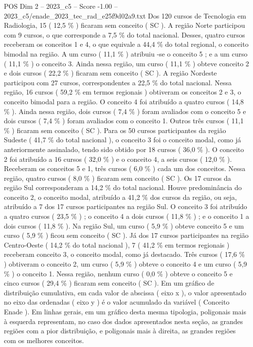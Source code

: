 \begin{textsample}{POS Dim 2 – 2023\_c5 – Score -1.00 – 2023\_c5/enade\_2023\_tec\_rad\_e25f9d02a9.txt}
Dos 120 cursos de Tecnologia em Radiologia, 15 ( 12,5 \% ) ficaram sem conceito ( SC ).
A região Norte participou com 9 cursos, o que corresponde a 7,5 \% do total nacional.
Desses, quatro cursos receberam os conceitos 1 e 4, o que equivale a 44,4 \% do total regional, o conceito bimodal na região.
A um curso ( 11,1 \% ) atribuiu -se o conceito 5 ; e a um curso ( 11,1 \% ) o conceito 3.
Ainda nessa região, um curso ( 11,1 \% ) obteve conceito 2 e dois cursos ( 22,2 \% ) ficaram sem conceito ( SC ).
A região Nordeste participou com 27 cursos, correspondentes a 22,5 \% do total nacional.
Nessa região, 16 cursos ( 59,2 \% em termos regionais ) obtiveram os conceitos 2 e 3, o conceito bimodal para a região.
O conceito 4 foi atribuído a quatro cursos ( 14,8 \% ).
Ainda nessa região, dois cursos ( 7,4 \% ) foram avaliados com o conceito 5 e dois cursos ( 7,4 \% ) foram avaliados com o conceito 1.
Outros três cursos ( 11,1 \% ) ficaram sem conceito ( SC ).
Para os 50 cursos participantes da região Sudeste ( 41,7 \% do total nacional ), o conceito 3 foi o conceito modal, como já anteriormente assinalado, tendo sido obtido por 18 cursos ( 36,0 \% ).
O conceito 2 foi atribuído a 16 cursos ( 32,0 \% ) e o conceito 4, a seis cursos ( 12,0 \% ).
Receberam os conceitos 5 e 1, três cursos ( 6,0 \% ) cada um dos conceitos.
Nessa região, quatro cursos ( 8,0 \% ) ficaram sem conceito ( SC ).
Os 17 cursos da região Sul corresponderam a 14,2 \% do total nacional.
Houve predominância do conceito 2, o conceito modal, atribuído a 41,2 \% dos cursos da região, ou seja, atribuído a 7 dos 17 cursos participantes na região Sul.
O conceito 3 foi atribuído a quatro cursos ( 23,5 \% ) ; o conceito 4 a dois cursos ( 11,8 \% ) ; e o conceito 1 a dois cursos ( 11,8 \% ).
Na região Sul, um curso ( 5,9 \% ) obteve conceito 5 e um curso ( 5,9 \% ) ficou sem conceito ( SC ).
Já dos 17 cursos participantes na região Centro-Oeste ( 14,2 \% do total nacional ), 7 ( 41,2 \% em termos regionais ) receberam conceito 3, o conceito modal, como já destacado.
Três cursos ( 17,6 \% ) obtiveram o conceito 2, um curso ( 5,9 \% ) obteve o conceito 4 e um curso ( 5,9 \% ) o conceito 1.
Nessa região, nenhum curso ( 0,0 \% ) obteve o conceito 5 e cinco cursos ( 29,4 \% ) ficaram sem conceito ( SC ).
Em um gráfico de distribuição cumulativa, em cada valor de abscissa ( eixo x ), o valor apresentado no eixo das ordenadas ( eixo y ) é o valor acumulado da variável ( Conceito Enade ).
Em linhas gerais, em um gráfico desta mesma tipologia, poligonais mais à esquerda representam, no caso dos dados apresentados nesta seção, as grandes regiões com a pior distribuição, e poligonais mais à direita, as grandes regiões com os melhores conceitos.

\end{textsample}
